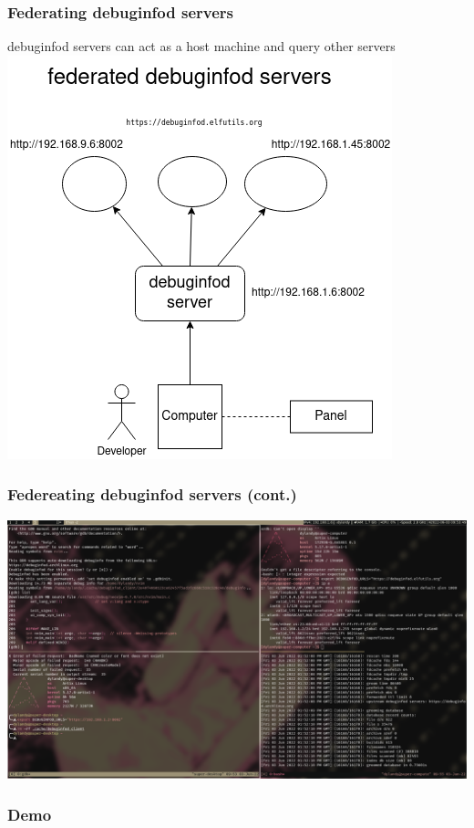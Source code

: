 \documentclass[12pt]{beamer}
\begin{document}
\begin{frame}[fragile]
   \frametitle{ Federating debuginfod servers}
   debuginfod servers can act as a host machine and query other servers
   \includegraphics[scale=0.45]{federeated_servers.png}
\end{frame}

\begin{frame}
   \frametitle{ Federeating debuginfod servers (cont.) }
   \includegraphics[scale=.178]{federated_ss.png}
\end{frame}

\begin{frame}
   \frametitle{ Demo}
\end{frame}
\end{document}
